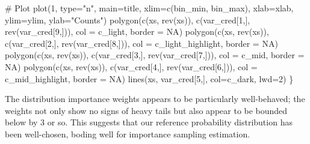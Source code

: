 \documentclass[
  letterpaper,
  DIV=11,
  numbers=noendperiod]{scrartcl}
\newenvironment{Shaded}{\begin{snugshade}}{\end{snugshade}}
\newcommand{\AttributeTok}[1]{\textcolor[rgb]{0.40,0.45,0.13}{#1}}
\newcommand{\CommentTok}[1]{\textcolor[rgb]{0.37,0.37,0.37}{#1}}
\newcommand{\ConstantTok}[1]{\textcolor[rgb]{0.56,0.35,0.01}{#1}}
\newcommand{\DecValTok}[1]{\textcolor[rgb]{0.68,0.00,0.00}{#1}}
\newcommand{\FunctionTok}[1]{\textcolor[rgb]{0.28,0.35,0.67}{#1}}
\newcommand{\NormalTok}[1]{\textcolor[rgb]{0.00,0.23,0.31}{#1}}
\newcommand{\StringTok}[1]{\textcolor[rgb]{0.13,0.47,0.30}{#1}}
\begin{document}
\begin{Shaded}
\begin{Highlighting}[]
  \CommentTok{\# Plot}
  \FunctionTok{plot}\NormalTok{(}\DecValTok{1}\NormalTok{, }\AttributeTok{type=}\StringTok{"n"}\NormalTok{, }\AttributeTok{main=}\NormalTok{title,}
       \AttributeTok{xlim=}\FunctionTok{c}\NormalTok{(bin\_min, bin\_max), }\AttributeTok{xlab=}\NormalTok{xlab,}
       \AttributeTok{ylim=}\NormalTok{ylim, }\AttributeTok{ylab=}\StringTok{"Counts"}\NormalTok{)}
  \FunctionTok{polygon}\NormalTok{(}\FunctionTok{c}\NormalTok{(xs, }\FunctionTok{rev}\NormalTok{(xs)), }\FunctionTok{c}\NormalTok{(var\_cred[}\DecValTok{1}\NormalTok{,], }\FunctionTok{rev}\NormalTok{(var\_cred[}\DecValTok{9}\NormalTok{,])),}
          \AttributeTok{col =}\NormalTok{ c\_light, }\AttributeTok{border =} \ConstantTok{NA}\NormalTok{)}
  \FunctionTok{polygon}\NormalTok{(}\FunctionTok{c}\NormalTok{(xs, }\FunctionTok{rev}\NormalTok{(xs)), }\FunctionTok{c}\NormalTok{(var\_cred[}\DecValTok{2}\NormalTok{,], }\FunctionTok{rev}\NormalTok{(var\_cred[}\DecValTok{8}\NormalTok{,])),}
          \AttributeTok{col =}\NormalTok{ c\_light\_highlight, }\AttributeTok{border =} \ConstantTok{NA}\NormalTok{)}
  \FunctionTok{polygon}\NormalTok{(}\FunctionTok{c}\NormalTok{(xs, }\FunctionTok{rev}\NormalTok{(xs)), }\FunctionTok{c}\NormalTok{(var\_cred[}\DecValTok{3}\NormalTok{,], }\FunctionTok{rev}\NormalTok{(var\_cred[}\DecValTok{7}\NormalTok{,])),}
          \AttributeTok{col =}\NormalTok{ c\_mid, }\AttributeTok{border =} \ConstantTok{NA}\NormalTok{)}
  \FunctionTok{polygon}\NormalTok{(}\FunctionTok{c}\NormalTok{(xs, }\FunctionTok{rev}\NormalTok{(xs)), }\FunctionTok{c}\NormalTok{(var\_cred[}\DecValTok{4}\NormalTok{,], }\FunctionTok{rev}\NormalTok{(var\_cred[}\DecValTok{6}\NormalTok{,])),}
          \AttributeTok{col =}\NormalTok{ c\_mid\_highlight, }\AttributeTok{border =} \ConstantTok{NA}\NormalTok{)}
  \FunctionTok{lines}\NormalTok{(xs, var\_cred[}\DecValTok{5}\NormalTok{,], }\AttributeTok{col=}\NormalTok{c\_dark, }\AttributeTok{lwd=}\DecValTok{2}\NormalTok{)}
\NormalTok{\}}
\end{Highlighting}
\end{Shaded}

The distribution importance weights appears to be particularly
well-behaved; the weights not only show no signs of heavy tails but also
appear to be bounded below by 3 or so. This suggests that our reference
probability distribution has been well-chosen, boding well for
importance sampling estimation.
\end{document}
